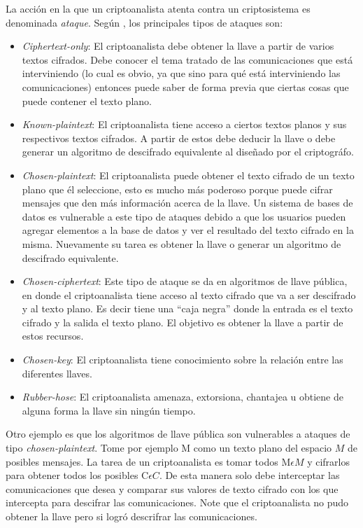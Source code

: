 La acción en la que un criptoanalista atenta contra un criptosistema es denominada \textit{ataque}. Según \cite{bruce,denning}, los principales tipos de ataques son:
\begin{itemize}

\item \textit{Ciphertext-only}: El criptoanalista debe obtener la llave a partir de varios textos cifrados. Debe conocer el tema tratado de las comunicaciones que está interviniendo (lo cual es obvio, ya que sino para qué está interviniendo las comunicaciones) entonces puede saber de forma previa que ciertas cosas que puede contener el texto plano.

\item \textit{Known-plaintext}: El criptoanalista tiene acceso a ciertos textos planos y sus respectivos textos cifrados. A partir de estos debe deducir la llave o debe generar un algoritmo de descifrado equivalente al diseñado por el criptográfo.

\item \textit{Chosen-plaintext}: El criptoanalista puede obtener el texto cifrado de un texto plano que él seleccione, esto es mucho más poderoso porque puede cifrar mensajes que den más información acerca de la llave. Un sistema de bases de datos es vulnerable a este tipo de ataques debido a que los usuarios pueden agregar elementos a la base de datos y ver el resultado del texto cifrado en la misma. Nuevamente su tarea es obtener la llave o generar un algoritmo de descifrado equivalente.

\item \textit{Chosen-ciphertext}: Este tipo de ataque se da en algoritmos de llave pública, en donde el criptoanalista tiene acceso al texto cifrado que va a ser descifrado y al texto plano. Es decir tiene una ``caja negra'' donde la entrada es el texto cifrado y la salida el texto plano. El objetivo es obtener la llave a partir de estos recursos.

\item \textit{Chosen-key}: El criptoanalista tiene conocimiento sobre la relación entre las diferentes llaves.

\item \textit{Rubber-hose}: El criptoanalista amenaza, extorsiona, chantajea u obtiene de alguna forma la llave sin ningún tiempo.
\end{itemize}


Otro ejemplo es que los algoritmos de llave pública son vulnerables a ataques de tipo \textit{chosen-plaintext}. Tome por ejemplo M como un texto plano del espacio $M$ de posibles mensajes. La tarea de un criptoanalista es tomar todos $\text{M} \epsilon M$ y cifrarlos para obtener todos los posibles $\text{C} \epsilon C$. De esta manera solo debe interceptar las comunicaciones que desea y comparar sus valores de texto cifrado con los que intercepta para descifrar las comunicaciones. Note que el criptoanalista no pudo obtener la llave pero si logró descrifrar las comunicaciones.


